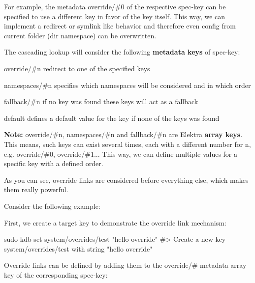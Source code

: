 For example, the metadata {\ttfamily override/\#0} of the respective {\ttfamily spec-\/key} can be specified to use a different key in favor of the key itself. This way, we can implement a redirect or symlink like behavior and therefore even config from current folder ({\ttfamily dir} namespace) can be overwritten.

The cascading lookup will consider the following {\bfseries metadata keys} of {\ttfamily spec-\/key}\+:


\begin{DoxyEnumerate}
\item {\ttfamily override/\#n} redirect to one of the specified keys
\item {\ttfamily namespaces/\#n} specifies which namespaces will be considered and in which order
\item {\ttfamily fallback/\#n} if no key was found these keys will act as a fallback
\item {\ttfamily default} defines a default value for the key if none of the keys was found
\end{DoxyEnumerate}

{\bfseries Note\+:} {\ttfamily override/\#n}, {\ttfamily namespaces/\#n} and {\ttfamily fallback/\#n} are Elektra {\bfseries array keys}. This means, such keys can exist several times, each with a different number for {\ttfamily n}, e.\+g. {\ttfamily override/\#0}, {\ttfamily override/\#1}... This way, we can define multiple values for a specific key with a defined order.

As you can see, override links are considered before everything else, which makes them really powerful.

Consider the following example\+:

First, we create a target key to demonstrate the override link mechanism\+:


\begin{DoxyCode}
sudo kdb set system/overrides/test "hello override"
#> Create a new key system/overrides/test with string "hello override"
\end{DoxyCode}


Override links can be defined by adding them to the {\ttfamily override/\#} metadata array key of the corresponding {\ttfamily spec-\/key}\+:




